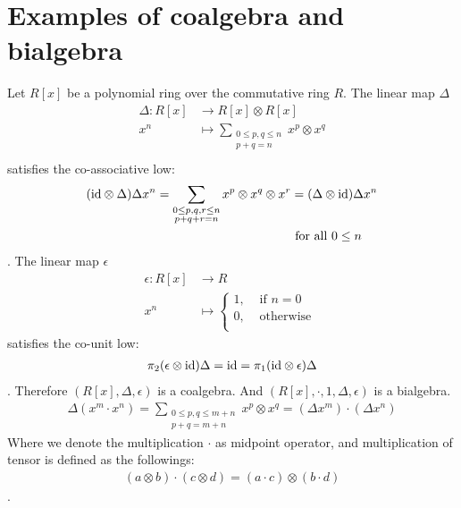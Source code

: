 \section{Examples of coalgebra and bialgebra}
\begin{example}[polynomial]\label{eg:coalgebra.polynomial}
Let $R[x]$ be a polynomial ring over the commutative ring $R$. 
The linear map $\Delta$
\begin{equation}\begin{split}
	\Delta: R[x] &\to R[x] \otimes R[x] \\
		x^n &\mapsto \sum_{\substack{0\le p,q \le n \\p+q=n}}x^p \otimes x^q \\
\end{split}\end{equation}
satisfies the co-associative low:
\begin{equation}\begin{split}
	({\operatorname{id}} \otimes \Delta) \Delta x^n
		= \sum_{\substack{0\le p,q,r \le n \\p+q+r=n}}x^p \otimes x^q \otimes x^r
		&= (\Delta \otimes {\operatorname{id}}) \Delta x^n \\
		&\text{ for all } 0 \le n
\end{split}\end{equation}
. The linear map $\epsilon$
\begin{equation}\begin{split}
	\epsilon: R[x] &\to R \\
		x^n &\mapsto 	\begin{cases}
			1, &\text{ if } n = 0 \\
			0, &\text{ otherwise } \\
		\end{cases}
\end{split}\end{equation}
satisfies the co-unit low:
\begin{equation}\begin{split}
	\pi_2(\epsilon \otimes {\operatorname{id}})\Delta
		= {\operatorname{id}}
		= \pi_1({\operatorname{id}} \otimes \epsilon)\Delta
\end{split}\end{equation}
. Therefore $(R[x], \Delta, \epsilon)$ is a coalgebra.
And $(R[x], \cdot, 1, \Delta, \epsilon)$ is a bialgebra.
\begin{equation}\begin{split}
	\Delta(x^m \cdot x^n)
		= \sum_{\substack{0\le p,q \le m+n \\p+q=m+n}}x^p \otimes x^q 
		= (\Delta x^m) \cdot (\Delta x^n)
\end{split}\end{equation}
Where we denote the multiplication $\cdot$ as midpoint operator,
and multiplication of tensor is defined as the followings:
\begin{equation}\begin{split}
	(a \otimes b) \cdot (c \otimes d) = (a \cdot c) \otimes (b \cdot d)
\end{split}\end{equation}
.
\end{example}

